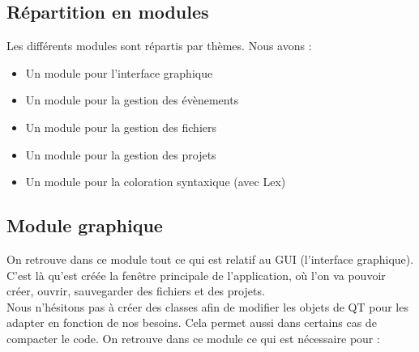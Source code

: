 \documentclass[a4paper,12pt]{article}
\begin{document}
	\subsection{Répartition en modules}
	
		Les différents modules sont répartis par thèmes. Nous avons :
		\begin{itemize}
			\item Un module pour l'interface graphique
			\item Un module pour la gestion des évènements
			\item Un module pour la gestion des fichiers
			\item Un module pour la gestion des projets
			\item Un module pour la coloration syntaxique (avec Lex)
		\end{itemize}
	
	\subsection{Module graphique}
	
		On retrouve dans ce module tout ce qui est relatif au GUI (l'interface graphique).\\
		C'est là qu'est créée la fenêtre principale de l'application, où l'on va pouvoir créer, ouvrir, sauvegarder des fichiers et des projets.\\
		Nous n'hésitons pas à créer des classes afin de modifier les objets de QT pour les adapter en fonction de nos besoins. Cela permet aussi dans certains cas de compacter le code.
		On retrouve dans ce module ce qui est nécessaire pour :
	
\end{document}
